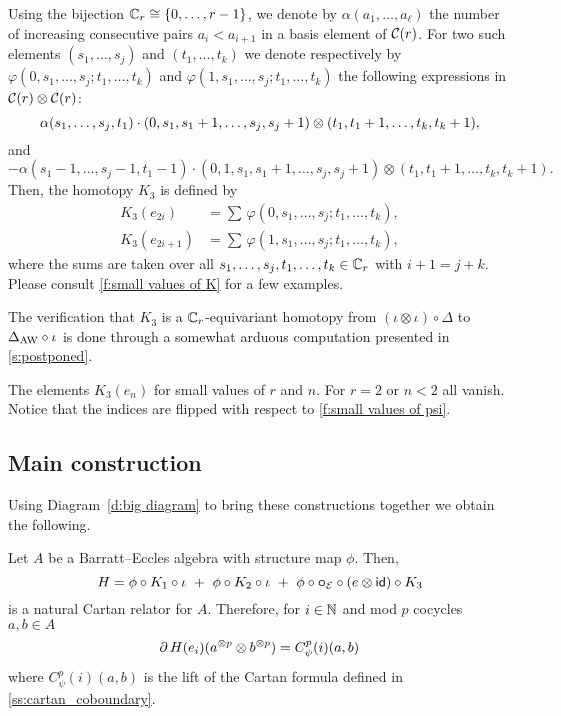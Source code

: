 Using the bijection $\mathbb{C}_r \cong \{0,\dots,r-1\}$, we denote by $\alpha(a_1,\dots,a_\ell)$ the number of increasing consecutive pairs $a_i < a_{i+1}$ in a basis element of $\mathcal{C}(r)$.
For two such elements $(s_1,\dots,s_j)$ and $(t_1,\dots,t_k)$ we denote respectively by $\varphi(0,s_1,\dots,s_j;t_1,\dots,t_k)$ and $\varphi(1,s_1,\dots,s_j;t_1,\dots,t_k)$ the following expressions in $\mathcal{C}(r) \otimes \mathcal{C}(r)$:
\[
\alpha(s_1,\dots,s_j,t_1) \cdot
(0,s_1,s_1+1,\dots,s_j,s_j+1) \otimes
(t_1,t_1+1,\dots,t_k,t_k+1),
\]
and
\[
- \alpha(s_1-1,\dots,s_j-1,t_1-1) \cdot
(0,1,s_1,s_1+1,\dots,s_j,s_j+1)\otimes (t_1,t_1+1,\dots,t_k,t_k+1).
\]
Then, the homotopy $K_3$ is defined by
\[
\begin{split}
	K_3(e_{2i})  &= \sum \, \varphi(0,s_1,\dots,s_j;t_1,\dots,t_k), \\
	K_3(e_{2i+1}) &= \sum \, \varphi(1,s_1,\dots,s_j;t_1,\dots,t_k),
\end{split}
\]
where the sums are taken over all $s_1,\dots,s_j,t_1,\dots,t_k \in \mathbb{C}_r$ with $i+1 = j+k$.
Please consult \cref{f:small values of K} for a few examples.

The verification that $K_3$ is a $\mathbb{C}_r$-equivariant homotopy from $(\iota\otimes \iota)\circ \Delta$ to $\Delta_{\operatorname{AW}}\circ \iota$ is done through a somewhat arduous computation presented in \cref{s:postponed}.

\begin{table}
	\centering
	
	\caption{The elements $K_3(e_n)$ for small values of $r$ and $n$. For $r=2$ or $n<2$ all vanish. Notice that the indices are flipped with respect to \cref{f:small values of psi}.}
	\label{f:small values of K}
\end{table}

\subsection{Main construction}

Using Diagram~\eqref{d:big diagram} to bring these constructions together we obtain the following.

\begin{theorem}
	Let $A$ be a Barratt--Eccles algebra with structure map $\phi$.
	Then,
	\[
	H = \phi \circ K_1 \circ \iota \ +\ \phi \circ K_2 \circ \iota \ +\ \phi \circ \bcirc_{\BE} \circ (e \ot \id)\circ K_3
	\]
	is a natural Cartan relator for $A$.
	Therefore, for $i \in \mathbb{N}$ and mod $p$ cocycles $a,b \in A$
	\[
	\operatorname{\partial} H(e_i)(a^{\otimes p} \otimes b^{\otimes p}) = C_\psi^p(i)(a, b)
	\]
	where $C_\psi^p(i)(a, b)$ is the lift of the Cartan formula defined in {\rm \cref{ss:cartan_coboundary}}.
\end{theorem}